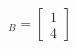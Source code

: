 \documentclass[preview]{standalone}
\begin{document}
\begin{align*}
[x]_B = \begin{bmatrix} 1 \\ 4 \end{bmatrix}
\end{align*}
\end{document}
